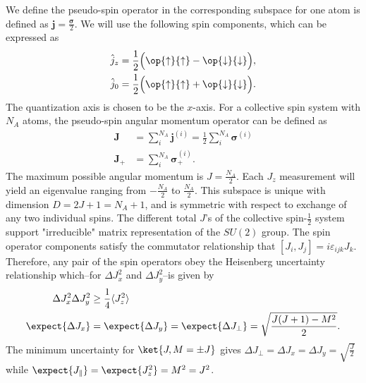 \documentclass[]{report}
\begin{document}
We define the pseudo-spin operator in the corresponding subspace for one atom is defined as $ \mathbf{j}=\frac{\boldsymbol{\sigma}}{2} $. We will use  the following spin components, which can be expressed as
\begin{align}
\hat{j}_z &= \frac{1}{2} \Big( \op{\uparrow}{\uparrow} - \op{\downarrow}{\downarrow}  \Big), \\
\hat{j}_0 &= \frac{1}{2} \Big( \op{\uparrow}{\uparrow} + \op{\downarrow}{\downarrow}  \Big).
\end{align}
The quantization axis is chosen to be the $ x $-axis. For a collective spin system with $ N_A $ atoms, the pseudo-spin angular momentum operator can be defined as
\begin{align}
\mathbf{J} &=\sum_i^{N_A}\mathbf{j}^{(i)}=\frac{1}{2}\sum_i^{N_A} \boldsymbol{\sigma}^{(i)}\\
\mathbf{J}_+ &=\sum_i^{N_A} \boldsymbol{\sigma}^{(i)}_+.
\end{align}
The maximum possible angular momentum is $ J=\frac{N_A}{2} $. Each $ J_z $ measurement will yield an eigenvalue ranging from $ -\frac{N_A}{2} $ to $ \frac{N_A}{2} $.  This subspace is unique with dimension $ D=2J+1=N_A+1 $, and is symmetric with respect to exchange of any two individual spins. The different total $ J $'s of the collective spin-$ \frac{1}{2} $ system support "irreducible" matrix representation of the $ SU(2) $ group. The spin operator components satisfy the commutator relationship that $ [J_i,J_j]=i\varepsilon_{ijk}J_k $. Therefore, any pair of the spin operators obey the Heisenberg uncertainty relationship which--for $ \Delta J_x^2 $ and $ \Delta J_y^2 $--is given by 
\begin{align}
\Delta J_x^2\Delta J_y^2 &\ge \frac{1}{4}\langle J_z^2\rangle \\
\expect{\Delta J_x} &=\expect{\Delta J_y}=\expect{\Delta J_{\perp}}=\sqrt{\frac{J(J+1)-M^2}{2}}.
\end{align}
The minimum uncertainty for $ \ket{J,M=\pm J} $ gives $ \Delta J_\perp=\Delta J_x=\Delta J_y = \sqrt{\frac{J}{2}} $ while $ \expect{J_\parallel}=\expect{J_z^2}=M^2=J^2 $. 
\end{document}

